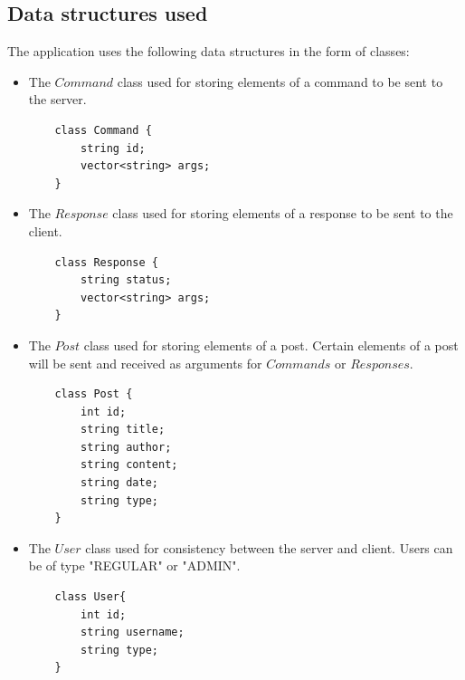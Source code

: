 \documentclass[runningheads, a4paper]{llncs}
\begin{document}
\subsection{Data structures used}
The application uses the following data structures in the form of classes:
\begin{itemize}
    \item The $Command$ class used for storing elements of a command to be sent to the server. 
    \begin{lstlisting}
    class Command {
        string id;
        vector<string> args;
    }
    \end{lstlisting}
    \item  The $Response$ class used for storing elements of a response to be sent to the client.
    \begin{lstlisting}
    class Response {
        string status;
        vector<string> args;
    }
    \end{lstlisting}
    \item The $Post$ class used for storing elements of a post. Certain elements of a post will be sent and received as arguments for $Commands$ or $Responses$.
    \begin{lstlisting}
    class Post {
        int id;
        string title;
        string author;
        string content;
        string date;
        string type;
    }
    \end{lstlisting}
    \item The $User$ class used for consistency between the server and client. Users can be of type "REGULAR" or "ADMIN".
    \begin{lstlisting}
    class User{
        int id;
        string username;
        string type;
    }
    \end{lstlisting}
\end{itemize}
\end{document}
